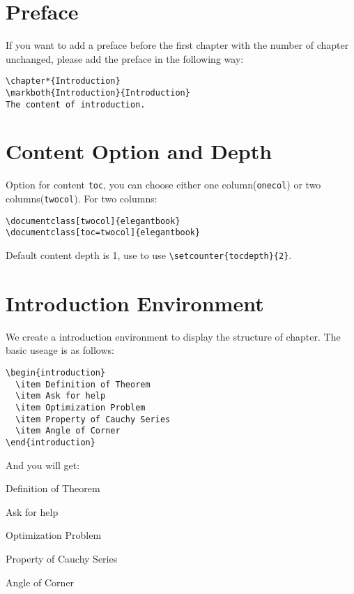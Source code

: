 \section{Preface}

If you want to add a preface before the first chapter with the number of chapter unchanged, please add the preface in the following way:
\begin{lstlisting}
\chapter*{Introduction}
\markboth{Introduction}{Introduction}
The content of introduction.
\end{lstlisting}


\section{Content Option and Depth}
Option for content \lstinline{toc}, you can choose either one column(\lstinline{onecol}) or two columns(\lstinline{twocol}). For two columns:
\begin{lstlisting}
\documentclass[twocol]{elegantbook}
\documentclass[toc=twocol]{elegantbook}
\end{lstlisting}

Default content depth is 1, use to use \lstinline|\setcounter{tocdepth}{2}|.


\section{Introduction Environment}
We create a introduction environment to display the structure of chapter. The basic useage is as follows:
\begin{lstlisting}
\begin{introduction}
  \item Definition of Theorem
  \item Ask for help
  \item Optimization Problem
  \item Property of Cauchy Series
  \item Angle of Corner
\end{introduction}
\end{lstlisting}
And you will get:
\begin{introduction}
    \item Definition of Theorem
    \item Ask for help
    \item Optimization Problem
    \item Property of Cauchy Series
    \item Angle of Corner
\end{introduction}

